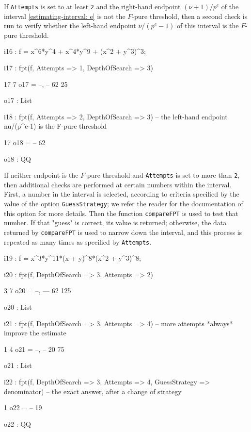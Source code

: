 \documentclass{amsart}
\begin{document}
If  {\tt Attempts} is set to at least {\tt 2} and the right-hand endpoint $(\nu+1)/p^e$ of the interval \eqref{estimating-interval: e} is not the $F$-pure threshold, then a second check is run to verify whether the left-hand endpoint $\nu/(p^e-1)$ of this interval is the $F$-pure threshold.

\medspace
{\small
{}
\begin{MyVerbatim}

i16 : f = x^6*y^4 + x^4*y^9 + (x^2 + y^3)^3;

i17 : fpt(f, Attempts => 1, DepthOfSearch => 3)

       17   7
o17 = {--, --}
       62  25

o17 : List

i18 : fpt(f, Attempts => 2, DepthOfSearch => 3) -- the left-hand endpoint
      nu/(p^e-1) is the F-pure threshold

      17
o18 = --
      62

o18 : QQ

\end{MyVerbatim}
}

If neither endpoint is the $F$-pure threshold and {\tt Attempts} is set to more than {\tt 2}, then  additional checks are performed at certain numbers within the interval.
First, a number in the interval is selected, according to criteria specified by the value of the option {\tt GuessStrategy}; we refer the reader for the documentation of this option for more details.
Then the function {\tt compareFPT} is used to test that number. If that "guess" is correct, its value is returned; otherwise, the data returned by {\tt compareFPT} is used to narrow down the interval, and this process is repeated as many times as specified by {\tt Attempts}.

\medspace
{\small
{}
\begin{MyVerbatim}

i19 : f = x^3*y^11*(x + y)^8*(x^2 + y^3)^8;

i20 : fpt(f, DepthOfSearch => 3, Attempts => 2)

        3   7
o20 = {--, ---}
       62  125

o20 : List

i21 : fpt(f, DepthOfSearch => 3, Attempts => 4) -- more attempts *always*
      improve the estimate

        1   4
o21 = {--, --}
       20  75

o21 : List

i22 : fpt(f, DepthOfSearch => 3, Attempts => 4, GuessStrategy => denominator)
      -- the exact answer, after a change of strategy

       1
o22 = --
      19

o22 : QQ
\end{MyVerbatim}
}
\medspace
\end{document}
